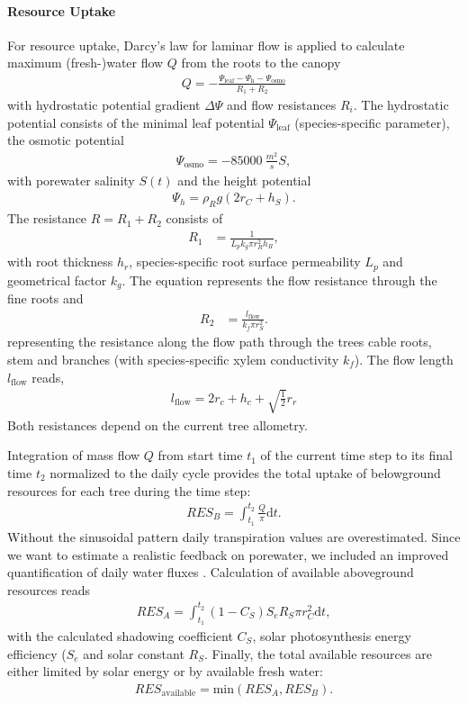 \documentclass[manusscript, 12p, authoryear]{elsarticle}
\begin{document}
\paragraph{\textbf{Resource Uptake}}
For resource uptake, Darcy's law for laminar flow is applied to calculate maximum (fresh-)water flow $Q$ from the roots to the canopy
\begin{align}
Q = -\frac{\Psi_{\text{leaf}}- \Psi_{\text{h}} -\Psi_{\text{osmo}}}{R_1 + R_2}
\end{align}
with hydrostatic potential gradient $\Delta \Psi$ and flow resistances $R_i$.
The hydrostatic potential consists of the minimal leaf potential $\Psi_{\text{leaf}}$ (species-specific parameter), the osmotic potential 
\begin{align}
\Psi_{\text{osmo}}= -\SI{85000}{\frac{m^2}{s}}S,
\end{align}
with porewater salinity $S(t)$ and the height potential 
\begin{align}
\Psi_h = \rho_R g (2r_C+h_S).
\end{align}
The resistance $R = R_1+R_2$ consists of
\begin{align}
R_1 &= \frac{1}{L_p k_g \pi r_R^2 h_R} ,\end{align}
with root thickness $h_r$, species-specific root surface permeability $L_p$ and geometrical factor $k_g$.
The equation represents the flow resistance through the fine roots and 
\begin{align}
R_2 &= \frac{l_{\text{flow}}}{k_f \pi r_S^2}.
\end{align}
representing the resistance along the flow path through the trees cable roots, stem and branches (with species-specific xylem conductivity $k_f$).
The flow length $l_{\text{flow}}$ reads,
\begin{align}
l_{\text{flow}} = 2 r_c + h_c + \sqrt{\frac{1}{2}} r_r
\end{align}
Both resistances depend on the current tree allometry.

Integration of mass flow $Q$ from start time $t_1$ of the current time step to its final time $t_2$ normalized to the daily cycle provides the total uptake of belowground resources for each tree during the time step:
\begin{align}
RES_B = \int_{t_1}^{t_2} \frac{Q}{\pi} \mathrm{d}t.
\end{align}
Without the sinusoidal pattern daily transpiration values are overestimated. Since we want to estimate a realistic feedback on porewater, we included an improved quantification of daily water fluxes \citep{Peters2020}.
Calculation of available aboveground resources reads
\begin{align}
RES_A = \int_{t_1}^{t_2} (1-C_S) S_e R_S \pi r_C^2 \mathrm{d}t,
\end{align}
with the calculated shadowing coefficient $C_S$, solar photosynthesis energy efficiency ($S_e$ and solar constant $R_S$.
Finally, the total available resources are either limited by solar energy or by available fresh water:
\begin{align}
RES_{\text{available}} = \text{min}\left(RES_A, RES_B\right).
\end{align}
\end{document}
